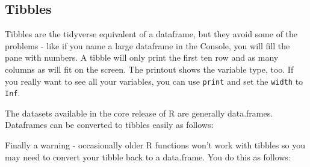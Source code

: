 \documentclass[titlepage]{book}\usepackage{knitr}
\begin{document}
\subsection{Tibbles}

Tibbles are the tidyverse equivalent of a dataframe, but they avoid some of the problems - like if you name a large dataframe in the Console, you will fill the pane with numbers. A tibble will only print the first ten row and as many columns as will fit on the screen. The printout shows the variable type, too.
If you really want to see all your variables, you can use \texttt{print} and set the \texttt{width} to \texttt{Inf}.

The datasets available in the core release of R are generally data.frames.  Dataframes can be converted to tibbles easily as follows:

\begin{knitrout}
\color{fgcolor}\begin{kframe}
\begin{alltt}
 \hlkwb{<-} 
\end{alltt}
\end{kframe}
\end{knitrout}


Finally a warning - occasionally older R functions won't work with tibbles so you may need to convert your tibble back to a data.frame. You do this as follows:

\begin{knitrout}
\color{fgcolor}\begin{kframe}
\begin{alltt}
 \hlkwb{<-} 
\end{alltt}
\end{kframe}
\end{knitrout}
\end{document}
